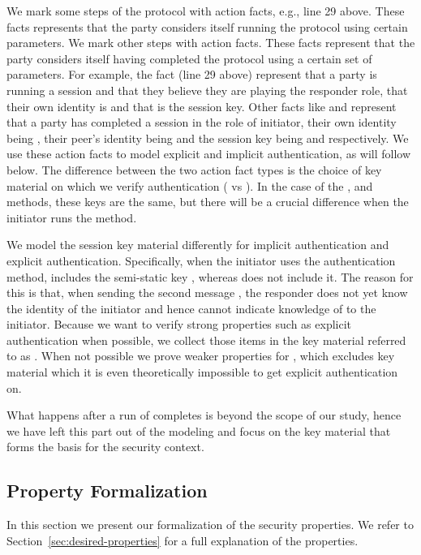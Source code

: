 We mark some steps of the protocol with  action facts, e.g., line 29
above.
%
These facts represents that the party considers itself running the
protocol using certain parameters.
%
We mark other steps with  action facts.
%
These facts represent that the party considers itself having
completed the protocol using a certain set of parameters.
%
For example, the fact  (line 29 above)
represent that a party is running a session and that they believe
they are playing the responder role, that their own identity is 
and that  is the session key.
%
Other facts like 
%
and  represent that a party has completed
a session in the role of initiator, their own identity being , their
peer's identity being  and the session key being  and
 respectively.
%
We use these action facts to model explicit and implicit authentication, as will
follow below.
%
The difference between the two  action fact types is the choice of
key material on which we verify authentication ( vs ).
%
In the case of the \mSigSig{}, \mSigStat{} and \mPskPsk{} methods, these keys
are the same, but there will be a crucial difference when the initiator runs
the \mStat{} method.
%

We model the session key material differently for implicit authentication and
explicit authentication.
%
Specifically, when the initiator uses the \mStat{} authentication method,
 includes the semi-static key \mGiy{}, whereas  does not
include it.
%
The reason for this is that, when sending the second message \mMsgtwo{}, the
responder does not yet know the identity of the initiator and hence cannot
indicate knowledge of \mGiy{} to the initiator.
%
Because we want to verify strong properties such as explicit authentication
when possible, we collect those items in the key material referred to as
.
%
When not possible we prove weaker properties for , which excludes
key material which it is even theoretically impossible to get explicit
authentication on.
%

What happens after a run of \mEdhoc{} completes is beyond the scope of our study, hence
we have left this part out of the modeling and focus on the key material
that forms the basis for the \mOscore{} security context.
%

\subsection{Property Formalization}
\label{sec:propertyFormalization}
In this section we present our formalization of the security properties. %
%
We refer to Section~\ref{sec:desired-properties} for a full explanation of the
properties.
\\

